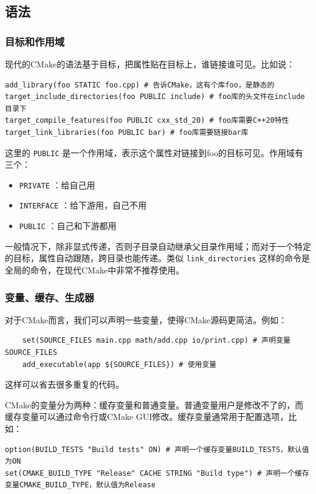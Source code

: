 \subsection{语法}

\subsubsection{目标和作用域}

现代的CMake的语法基于目标，把属性贴在目标上，谁链接谁可见。比如说：
\begin{verbatim}
add_library(foo STATIC foo.cpp) # 告诉CMake，这有个库foo，是静态的
target_include_directories(foo PUBLIC include) # foo库的头文件在include目录下
target_compile_features(foo PUBLIC cxx_std_20) # foo库需要C++20特性
target_link_libraries(foo PUBLIC bar) # foo库需要链接bar库
\end{verbatim}

这里的 \texttt{PUBLIC} 是一个作用域，表示这个属性对链接到foo的目标可见。作用域有三个：
\begin{itemize}
    \item  \texttt{PRIVATE} ：给自己用
    \item  \texttt{INTERFACE} ：给下游用，自己不用
    \item  \texttt{PUBLIC} ：自己和下游都用
\end{itemize}

一般情况下，除非显式传递，否则子目录自动继承父目录作用域；而对于一个特定的目标，属性自动跟随，跨目录也能传递。类似 \texttt{link\_directories} 这样的命令是全局的命令，在现代CMake中非常不推荐使用。

\subsubsection{变量、缓存、生成器}

对于CMake而言，我们可以声明一些变量，使得CMake源码更简洁。例如：
\begin{verbatim}
    set(SOURCE_FILES main.cpp math/add.cpp io/print.cpp) # 声明变量SOURCE_FILES
    add_executable(app ${SOURCE_FILES}) # 使用变量
\end{verbatim}
这样可以省去很多重复的代码。

CMake的变量分为两种：缓存变量和普通变量。普通变量用户是修改不了的，而缓存变量可以通过命令行或CMake GUI修改。缓存变量通常用于配置选项，比如：
\begin{verbatim}
option(BUILD_TESTS "Build tests" ON) # 声明一个缓存变量BUILD_TESTS，默认值为ON
set(CMAKE_BUILD_TYPE "Release" CACHE STRING "Build type") # 声明一个缓存变量CMAKE_BUILD_TYPE，默认值为Release
\end{verbatim}

